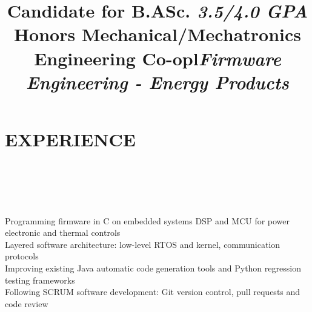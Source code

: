\documentclass[mm]{res}
\begin{document}
\begin{resume}
\title{Candidate for B.ASc. \textsl{3.5/4.0 GPA}\\
Honors Mechanical/Mechatronics Engineering Co-op}
\begin{position}
\end{position}


\toprule
\section{\faBlackTie \xspace EXPERIENCE \xspace}
\begin{format}
\\
\title{l}\\
\body\\
\end{format}

\title{\textsl{Firmware Engineering - Energy Products}}
\begin{position}
\tb Programming firmware in C on embedded systems DSP and MCU for power electronic and thermal controls\\
\tb Layered software architecture: low-level RTOS and kernel, communication protocols \\
\tb Improving existing Java automatic code generation tools and Python regression testing frameworks\\
\tb Following SCRUM software development: Git version control, pull requests and code review
\end{position}


\end{resume}
\end{document}
